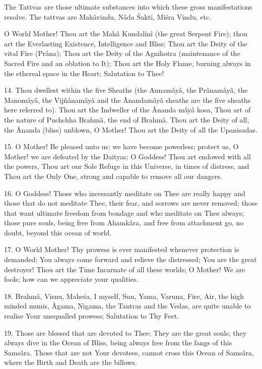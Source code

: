 The Tattvas are those ultimate substances into which these gross manifestations resolve. The tattvas are Mah\^avindu, N\^ada \'Sakti, Mi\'sra Vindu, etc.

O World Mother! Thou art the Mah\^a Kundalin\^i (the great Serpent Fire); thou art the Everlasting Existence, Intelligence and Bliss; Thou art the Deity of the vital Fire (Pr\^ana); Thou art the Deity of the Agnihotra (maintenance of the Sacred Fire and an oblation to It); Thou art the Holy Flame, burning always in the ethereal space in the Heart; Salutation to Thee!

14. Thou dwellest within the five Sheaths (the Annam\^ay\^a, the Pr\^anam\^ay\^a, the Manom\^ay\^a, the Vijñ\^anam\^ay\^a and the \^Anandam\^ay\^a sheaths are the five sheaths here referred to). Thou art the Indweller of the \^Ananda m\^ay\^a kosa, Thou art of the nature of Puchchha Brahm\^a, the end of Brahm\^a. Thou art the Deity of all, the \^Ananda (bliss) unblown, O Mother! Thou art the Deity of all the Upanisadas.

15. O Mother! Be pleased unto us; we have become powerless; protect us, O Mother! we are defeated by the Daityas; O Goddess! Thou art endowed with all the powers, Thou art our Sole Refuge in this Universe, in times of distress, and Thou art the Only One, strong and capable to remove all our dangers.

16. O Goddess! Those who incessantly meditate on Thee are really happy and those that do not meditate Thee, their fear, and sorrows are never removed; those that want ultimate freedom from bondage and who meditate on Thee always; those pure souls, being free from Ahamk\^ara, and free from attachment go, no doubt, beyond this ocean of world.

17. O World Mother! Thy prowess is ever manifested whenever protection is demanded; You always come forward and relieve the distressed; You are the great destroyer! Thou art the Time Incarnate of all these worlds; O Mother! We are fools; how can we appreciate your qualities.

18. Brahm\^a, Visnu, Mahe\'sa, I myself, Sun, Yama, Varuna, Fire, Air, the high minded munis, \^Agama, Nigama, the Tantras and the Vedas, are quite unable to realise Your unequalled prowess; Salutation to Thy Feet.

19. Those are blessed that are devoted to Thee; They are the great souls; they always dive in the Ocean of Bliss, being always free from the fangs of this Sams\^ara. Those that are not Your devotees, cannot cross this Ocean of Sams\^ara, where the Birth and Death are the billows.

